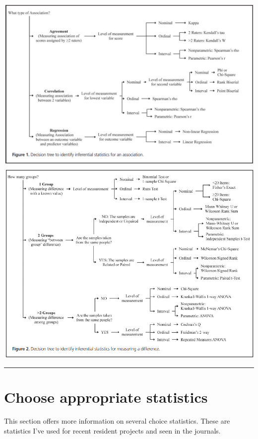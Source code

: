 \documentclass[
  letterpaper,
  DIV=11,
  numbers=noendperiod]{scrreprt}
\begin{document}
\includegraphics{./images/stat-tree-fig1.PNG}
\includegraphics{./images/stat-tree-fig2.png}

\begin{center}\rule{0.5\linewidth}{0.5pt}\end{center}

\hypertarget{choose-appropriate-statistics}{%
\section*{Choose appropriate
statistics}\label{choose-appropriate-statistics}}

This section offers more information on several choice statistics. These
are statistics I've used for recent resident projects and seen in the
journals.
\end{document}
